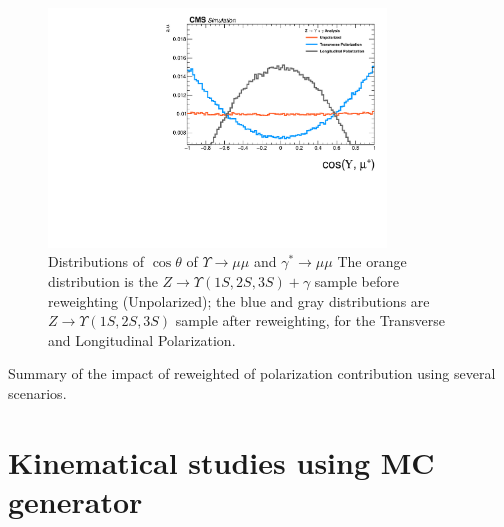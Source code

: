 \begin{figure}[!htbp]
\begin{center}
\includegraphics[width=0.80\textwidth]{figures_and_tables/outputPlots/ZtoUpsilon_Cat0_ZZZZZ/mc/polarizatioReweight/h_Gen_COS_theta_extremes}
\end{center}\vspace*{-.5cm}
\caption{Distributions of $\cos \theta$ of $\Upsilon \rightarrow \mu\mu$ and $\gamma^{*} \rightarrow \mu\mu$ The orange distribution is the $Z \rightarrow  \Upsilon(1S,2S,3S) + \gamma$ sample before reweighting (Unpolarized); the blue and gray distributions are $Z \rightarrow  \Upsilon(1S,2S,3S)$ sample after reweighting, for the Transverse and Longitudinal Polarization.}
\label{fig:ZUpsilonPolarization}
\end{figure}


\begin{table}[htp]
\begin{center}

\caption{Summary of the impact of reweighted of polarization contribution using several scenarios.}
\label{fig:polTable}
\end{center}
\end{table} 



\section{Kinematical studies using MC generator}


